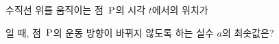 수직선 위를 움직이는 점~$\mathrm{P}$의 시각 $t$에서의 위치가 \par\smallskip{}\par\smallskip\noindent 일 때, 점~$\mathrm{P}$의 운동 방향이 바뀌지 않도록 하는 실수 $a$의 최솟값은?
